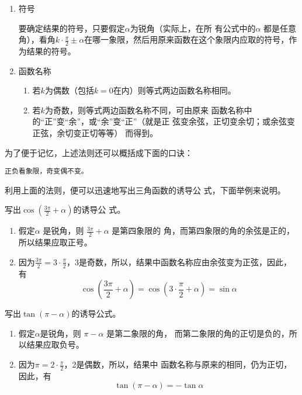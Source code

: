 \begin{enumerate}
    \item 符号
    
要确定结果的符号，只要假定$\alpha$为锐角（实际上，在所
有公式中的$\alpha$ 都是任意角），看角$k\cdot \frac{\pi}{2}\pm \alpha$在哪一象限，然后用原来函数在这个象限内应取的符号，作为结果的符号。

\item 函数名称
\begin{enumerate}
    \item 若$k$为偶数（包括$k=0$在内）则等式两边函数名称相同。
    \item 若$k$为奇数，则等式两边函数名称不同，可由原来
函数名称中的“正”变“余”，或“余”变“正”（就是正
弦变余弦，正切变余切；或余弦变正弦，余切变正切等等）
而得到。
\end{enumerate}
\end{enumerate}

为了便于记忆，上述法则还可以概括成下面的口诀：
\begin{center}
\verb|正负看象限，奇变偶不变。 |
\end{center}

利用上面的法则，便可以迅速地写出三角函数的诱导公
式，下面举例来说明。

\begin{example}
    写出$\cos\left(\frac{3\pi}{2}+\alpha\right)$的诱导公
    式。
\end{example}

\begin{solution}
\begin{enumerate}
    \item 假定$\alpha$ 是锐角，则
$\frac{3\pi}{2}+\alpha$ 是第四象限的
角，而第四象限的角的余弦是正的，所以结果应取正号。
\item 因为$\frac{3\pi}{2}=3\cdot \frac{\pi}{2}$，3是奇数，所以，结果中函数名称应由余弦变为正弦，因此，有
\[\cos\left(\frac{3\pi}{2}+\alpha\right)=\cos\left(3\cdot \frac{\pi}{2}+\alpha\right)=\sin\alpha\]
\end{enumerate}
\end{solution}

\begin{example}
    写出$\tan(\pi-\alpha)$的诱导公式。
\end{example}

\begin{solution}
\begin{enumerate}
    \item 假定$\alpha$是锐角，则
$\pi -\alpha$ 是第二象限的角，
而第二象限的角的正切是负的，所以结果应取负号。
\item 因为$\pi =2\cdot\frac{\pi}{2}$，2是偶数，所以，结果中
函数名称与原来的相同，仍为正切，因此，有
\[\tan(\pi -\alpha )=-\tan\alpha \]
\end{enumerate}
\end{solution}

